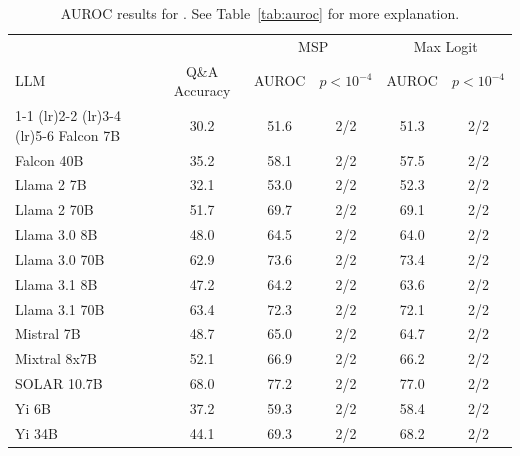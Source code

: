 \begin{table}[h]
\caption{AUROC results for . See Table~\ref{tab:auroc} for more explanation.}
\label{tab:auroc_margin}
\centering
\begin{tabular}{lccccc}
\toprule
& & \multicolumn{2}{c}{MSP} & \multicolumn{2}{c}{Max Logit} \\ 
LLM & Q\&A Accuracy & AUROC & $p < 10^{-4}$ & AUROC & $p < 10^{-4}$ \\ 
\cmidrule(lr){1-1} \cmidrule(lr){2-2} \cmidrule(lr){3-4} \cmidrule(lr){5-6} 
Falcon 7B & 30.2 & 51.6 & 2/2 & 51.3 & 2/2\\
Falcon 40B & 35.2 & 58.1 & 2/2 & 57.5 & 2/2\\
Llama 2 7B & 32.1 & 53.0 & 2/2 & 52.3 & 2/2\\
Llama 2 70B & 51.7 & 69.7 & 2/2 & 69.1 & 2/2\\
Llama 3.0 8B & 48.0 & 64.5 & 2/2 & 64.0 & 2/2\\
Llama 3.0 70B & 62.9 & 73.6 & 2/2 & 73.4 & 2/2\\
Llama 3.1 8B & 47.2 & 64.2 & 2/2 & 63.6 & 2/2\\
Llama 3.1 70B & 63.4 & 72.3 & 2/2 & 72.1 & 2/2\\
Mistral 7B & 48.7 & 65.0 & 2/2 & 64.7 & 2/2\\
Mixtral 8x7B & 52.1 & 66.9 & 2/2 & 66.2 & 2/2\\
SOLAR 10.7B & 68.0 & 77.2 & 2/2 & 77.0 & 2/2\\
Yi 6B & 37.2 & 59.3 & 2/2 & 58.4 & 2/2\\
Yi 34B & 44.1 & 69.3 & 2/2 & 68.2 & 2/2\\
\bottomrule
\end{tabular}
\end{table}

